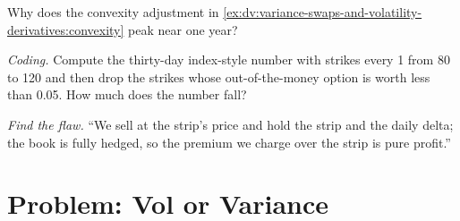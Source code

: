 \begin{exercise}[$\star\star$]\label{exo:dv:variance-swaps-and-volatility-derivatives:6}
Why does the convexity adjustment in \cref{ex:dv:variance-swaps-and-volatility-derivatives:convexity} peak near one
year?
\end{exercise}

\begin{exercise}[$\star\star\star$]\label{exo:dv:variance-swaps-and-volatility-derivatives:7}
\emph{Coding.} Compute the thirty-day index-style number with strikes every 1 from 80 to 120 and then drop the
strikes whose out-of-the-money option is worth less than 0.05. How much does the number fall?
\end{exercise}

\begin{exercise}[$\star\star\star$]\label{exo:dv:variance-swaps-and-volatility-derivatives:8}
\emph{Find the flaw.} ``We sell  at the strip's price and hold the strip and the daily delta; the
book is fully hedged, so the premium we charge over the strip is pure profit.''
\end{exercise}

\section{Problem: Vol or Variance}

